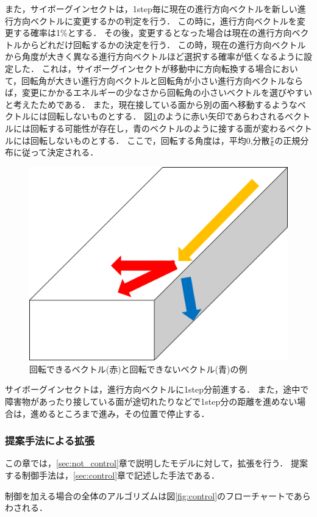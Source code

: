 \documentclass[a4paper,11pt]{jarticle}
\begin{document}
	
	また，サイボーグインセクトは，1step毎に現在の進行方向ベクトルを新しい進行方向ベクトルに変更するかの判定を行う．
	この時に，進行方向ベクトルを変更する確率は1\%とする．
	その後，変更するとなった場合は現在の進行方向ベクトルからどれだけ回転するかの決定を行う．
	この時，現在の進行方向ベクトルから角度が大きく異なる進行方向ベクトルほど選択する確率が低くなるように設定した．
	これは，サイボーグインセクトが移動中に方向転換する場合において，回転角が大きい進行方向ベクトルと回転角が小さい進行方向ベクトルならば，変更にかかるエネルギーの少なさから回転角の小さいベクトルを選びやすいと考えたためである．
	また，現在接している面から別の面へ移動するようなベクトルには回転しないものとする．
	図\ref{fig:bend}のように赤い矢印であらわされるベクトルには回転する可能性が存在し，青のベクトルのように接する面が変わるベクトルには回転しないものとする．
	ここで，回転する角度は，平均0,分散$\frac{\pi}{6}$の正規分布に従って決定される．
	\begin{figure}
		\centering
		\includegraphics[width=0.35\linewidth]{png/bend.png}
		\caption[ベクトルの決定]{回転できるベクトル(赤)と回転できないベクトル(青)の例}
		\label{fig:bend}
	\end{figure}

	サイボーグインセクトは，進行方向ベクトルに1step分前進する．
	また，途中で障害物があったり接している面が途切れたりなどで1step分の距離を進めない場合は，進めるところまで進み，その位置で停止する．

	
	\subsubsection{提案手法による拡張}
	この章では，\ref{sec:not_control}章で説明したモデルに対して，拡張を行う．
	提案する制御手法は，\ref{sec:control}章で記述した手法である．
	
	制御を加える場合の全体のアルゴリズムは図\ref{fig:control}のフローチャートであらわされる．
	
\end{document}
